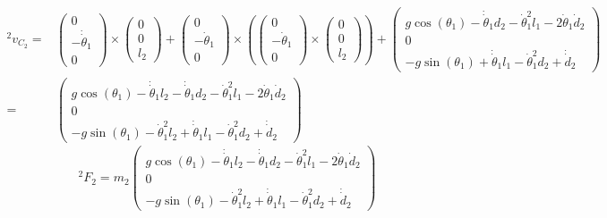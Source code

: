 \documentclass[10pt,a4paper]{article}
\begin{document}
\begin{align*}
  {}^{2}v_{C_{2}} = & \begin{pmatrix}
    0\\-\dot{\dot{\theta}}_{1}\\0
  \end{pmatrix} \times \begin{pmatrix}
    0\\0\\l_{2}
  \end{pmatrix} + \begin{pmatrix}
    0\\-\dot{\theta}_{1}\\0
  \end{pmatrix} \times \left( \begin{pmatrix}
    0\\-\dot{\theta}_{1}\\0
  \end{pmatrix} \times \begin{pmatrix}
    0\\0\\l_{2}
  \end{pmatrix} \right) + \begin{pmatrix}
    g\cos(\theta_{1}) - \dot{\dot{\theta}}_{1}d_{2} - \dot{\theta}_{1}^{2}l_{1} - 2\dot{\theta}_{1}\dot{d}_{2}\\
    0\\
    -g\sin(\theta_{1}) + \dot{\dot{\theta}}_{1}l_{1} - \dot{\theta}_{1}^{2}d_{2} + \dot{\dot{d}}_{2}
  \end{pmatrix}\\
  = & \begin{pmatrix}
    g\cos(\theta_{1}) - \dot{\dot{\theta}}_{1}l_{2} - \dot{\dot{\theta}}_{1}d_{2} - \dot{\theta}_{1}^{2}l_{1} - 2\dot{\theta}_{1}\dot{d}_{2}\\
    0\\
    -g\sin(\theta_{1}) - \dot{\theta}_{1}^{2}l_{2} + \dot{\dot{\theta}}_{1}l_{1} - \dot{\theta}_{1}^{2}d_{2} + \dot{\dot{d}}_{2}
  \end{pmatrix}
\end{align*}
\begin{equation*}
  {}^{2}F_{2} = m_{2}\begin{pmatrix}
    g\cos(\theta_{1}) - \dot{\dot{\theta}}_{1}l_{2} - \dot{\dot{\theta}}_{1}d_{2} - \dot{\theta}_{1}^{2}l_{1} - 2\dot{\theta}_{1}\dot{d}_{2}\\
    0\\
    -g\sin(\theta_{1}) - \dot{\theta}_{1}^{2}l_{2} + \dot{\dot{\theta}}_{1}l_{1} - \dot{\theta}_{1}^{2}d_{2} + \dot{\dot{d}}_{2}
  \end{pmatrix}
\end{equation*}
\end{document}
